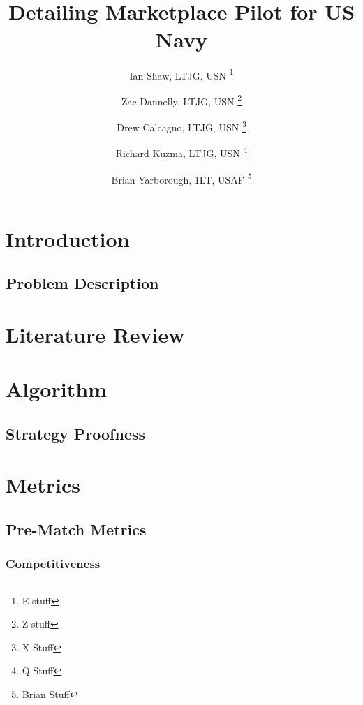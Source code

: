 \documentclass{article}
\title{\projectname \\ \large Detailing Marketplace Pilot for US Navy}
\author{Ian Shaw, LTJG, USN \thanks{E stuff} 
\and Zac Dannelly, LTJG, USN \thanks{Z stuff}
\and Drew Calcagno, LTJG, USN \thanks{X Stuff} 
\and Richard Kuzma, LTJG, USN \thanks{Q Stuff} 
\and Brian Yarborough, 1LT, USAF \thanks{Brian Stuff}}
\begin{document}
\maketitle

\begin{abstract}

\end{abstract}

\newpage

\tableofcontents

\newpage

\section{Introduction}



\subsection{Problem Description}



\section{Literature Review}



\section{Algorithm}



\subsection{Strategy Proofness}

\section{Metrics}

\subsection{Pre-Match Metrics}

\subsubsection{Competitiveness}
\end{document}
